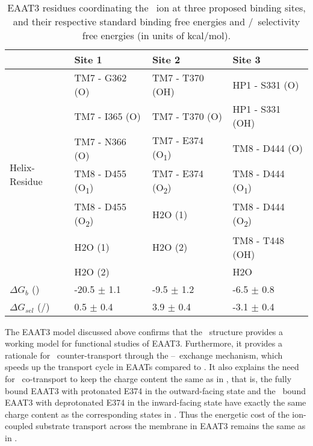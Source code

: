 \begin{table}[b!]
\caption{EAAT3 residues coordinating the \K\ ion at three proposed binding
sites, and their respective standard binding free energies and \K/\Na\ 
selectivity free energies (in units of kcal/mol). }
\begin{center}
\begin{tabular}{llll}
\hline
 & Site 1 & Site 2 & Site 3 \\ \hline
\multirow{7}{*}{Helix-Residue} & \multicolumn{ 1}{l}{TM7 - G362 (O)} & TM7 - 
T370 (OH) & HP1 - S331 (O) \\
\multicolumn{ 1}{l}{} & TM7 - I365 (O) & TM7 - T370 (O) & HP1 - S331 (OH) \\
\multicolumn{ 1}{l}{} & TM7 - N366 (O) & TM7 - E374 (O\textsubscript{1}) & TM8 - 
D444 (O) \\
\multicolumn{ 1}{l}{} & TM8 - D455 (O\textsubscript{1}) & TM7 - E374 
(O\textsubscript{2}) & TM8 - D444 (O\textsubscript{1}) \\
\multicolumn{ 1}{l}{} & TM8 - D455 (O\textsubscript{2}) & H2O (1) & TM8 - D444 
(O\textsubscript{2}) \\
\multicolumn{ 1}{l}{} & H2O (1) & H2O (2) & TM8 - T448 (OH) \\
\multicolumn{ 1}{l}{} & H2O (2) &  & H2O \\ \hline
\multicolumn{ 1}{l}{$\Delta G_{b}$ (\K)} & -20.5 $\pm$ 1.1 & -9.5 $\pm$ 1.2 
& -6.5 $\pm$ 0.8 \\
\multicolumn{ 1}{l}{$\Delta G_{sel}$ (\K/\Na)} & 0.5 $\pm$ 0.4 & 3.9 
$\pm$ 
0.4 & -3.1 $\pm$ 0.4 \\ \hline
\end{tabular}
\end{center}
\label{review:tab3}
\end{table}

The EAAT3 model discussed above \cite{Heinzelmann2014b} confirms that the 
\GltPh\ structure provides a working model for functional studies of EAAT3. 
Furthermore, it provides a rationale for \K\ counter-transport through the 
\K--\Na\ exchange mechanism, which speeds up the transport cycle in EAATs 
compared to \GltPh. It also explains the need for \Hi\ co-transport to keep 
the charge content the same as in \GltPh, that is, the fully bound EAAT3 with 
protonated E374 in the outward-facing state and the \K\ bound EAAT3 with 
deprotonated E374 in the inward-facing state have exactly the same charge 
content as the corresponding states in \GltPh. Thus the energetic cost of the 
ion-coupled substrate transport across the membrane in EAAT3 remains the same 
as in \GltPh. 

